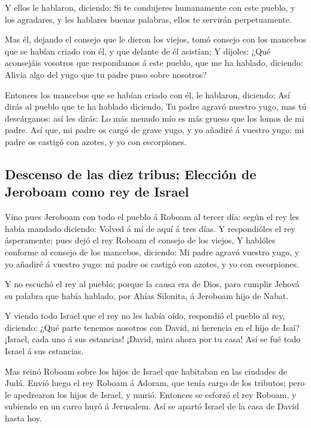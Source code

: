  Y ellos le hablaron, diciendo: Si te condujeres
humanamente con este pueblo, y los agradares, y les hablares buenas
palabras, ellos te servirán perpetuamente.

 Mas él, dejando el consejo que le dieron los viejos, tomó
consejo con los mancebos que se habían criado con él, y que delante de
él asistían;  Y díjoles: ¿Qué aconsejáis vosotros que
respondamos á este pueblo, que me ha hablado, diciendo: Alivia algo del
yugo que tu padre puso sobre nosotros?

 Entonces los mancebos que se habían criado con él, le
hablaron, diciendo: Así dirás al pueblo que te ha hablado diciendo, Tu
padre agravó nuestro yugo, mas tú descárganos: así les dirás: Lo más
menudo mío es más grueso que los lomos de mi padre.  Así
que, mi padre os cargó de grave yugo, y yo añadiré á vuestro yugo: mi
padre os castigó con azotes, y yo con escorpiones.

\hypertarget{descenso-de-las-diez-tribus-elecciuxf3n-de-jeroboam-como-rey-de-israel}{%
\subsection{Descenso de las diez tribus; Elección de Jeroboam como rey
de
Israel}\label{descenso-de-las-diez-tribus-elecciuxf3n-de-jeroboam-como-rey-de-israel}}

 Vino pues Jeroboam con todo el pueblo á Roboam al tercer
día: según el rey les había mandado diciendo: Volved á mí de aquí á tres
días.  Y respondióles el rey ásperamente; pues dejó el
rey Roboam el consejo de los viejos,  Y hablóles conforme
al consejo de los mancebos, diciendo: Mi padre agravó vuestro yugo, y yo
añadiré á vuestro yugo: mi padre os castigó con azotes, y yo con
escorpiones.

 Y no escuchó el rey al pueblo; porque la causa era de
Dios, para cumplir Jehová su palabra que había hablado, por Ahías
Silonita, á Jeroboam hijo de Nabat.

 Y viendo todo Israel que el rey no les había oído,
respondió el pueblo al rey, diciendo: ¿Qué parte tenemos nosotros con
David, ni herencia en el hijo de Isaí? ¡Israel, cada uno á sus
estancias! ¡David, mira ahora por tu casa! Así se fué todo Israel á sus
estancias.

 Mas reinó Roboam sobre los hijos de Israel que habitaban
en las ciudades de Judá.  Envió luego el rey Roboam á
Adoram, que tenía cargo de los tributos; pero le apedrearon los hijos de
Israel, y murió. Entonces se esforzó el rey Roboam, y subiendo en un
carro huyó á Jerusalem.  Así se apartó Israel de la casa
de David hasta hoy.

